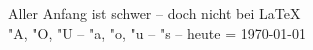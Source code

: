 \documentclass{article}
\begin{document}
Aller Anfang ist schwer -- doch nicht bei \LaTeX\\
"A, "O, "U -- "a, "o, "u -- "s -- heute = \today
\end{document}
